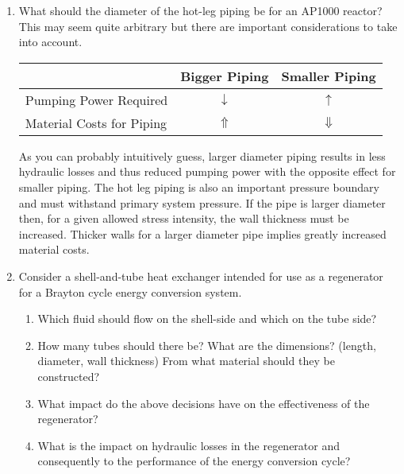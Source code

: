 \begin{enumerate}
\item What should the diameter of the hot-leg piping be for an AP1000 reactor? This may seem quite arbitrary but there are important considerations to take into account.  

\begin{table}
\begin{tabular}{l|c|c}
  & Bigger Piping & Smaller Piping \\
\hline
Pumping Power Required & $\downarrow$   & $\uparrow$  \\
\hline
Material Costs for Piping & $\Uparrow$  & $\Downarrow$ \\
\end{tabular}
\end{table}
As you can probably intuitively guess, larger diameter piping results in less hydraulic losses and thus reduced pumping power with the opposite effect for smaller piping. The hot leg piping is also an important pressure boundary and must withstand primary system pressure.  If the pipe is larger diameter then, for a given allowed stress intensity, the wall thickness must be increased.  Thicker walls for a larger diameter pipe implies greatly increased material costs.  

\item Consider a shell-and-tube heat exchanger intended for use as a regenerator for a Brayton cycle energy conversion system. 
\begin{enumerate}
\item Which fluid should flow on the shell-side and which on the tube side?
\item How many tubes should there be? What are the dimensions? (length, diameter, wall thickness) From what material should they be constructed?
\item What impact do the above decisions have on the effectiveness of the regenerator?
\item What is the impact on hydraulic losses in the regenerator and consequently to the performance of the energy conversion cycle?
\end{enumerate}

\end{enumerate}

